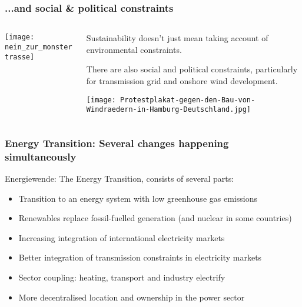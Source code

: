 \documentclass[10pt,aspectratio=169,dvipsnames]{beamer}
\let\olditem\item
\renewcommand{\item}{%
\olditem\vspace{5pt}}
\begin{document}
\begin{frame}[fragile]
  \frametitle{...and social \& political constraints}



\begin{columns}[T]

  \begin{column}{5cm}


\centering
\texttt{[image: nein\_zur\_monstertrasse]}

  \end{column}


  \begin{column}{6.7cm}

    \vspace{.5cm}

    Sustainability doesn't just mean taking account of environmental constraints.

    \vspace{.5cm}

    There are also \alert{social and political constraints},
    particularly for transmission grid and onshore wind
    development.

    \vspace{.5cm}

\texttt{[image: Protestplakat-gegen-den-Bau-von-Windraedern-in-Hamburg-Deutschland.jpg]}

  \end{column}

\end{columns}

\end{frame}


\begin{frame}
  \frametitle{Energy Transition: Several changes happening simultaneously}

  \alert{Energiewende}: The Energy Transition, consists of several parts:

  \begin{itemize}
  \item Transition to an energy system with low greenhouse gas emissions
  \item Renewables replace fossil-fuelled generation (and nuclear in some countries)
  \item Increasing integration of international electricity markets
  \item Better integration of transmission constraints in electricity markets
  \item Sector coupling: heating, transport and industry electrify
  \item More decentralised location and ownership in the power sector
  \end{itemize}

\end{frame}
\end{document}
